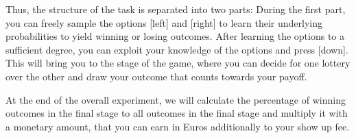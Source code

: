 \documentclass[12pt, oneside]{scrartcl}
\begin{document}
Thus, the structure of the task is separated into two parts: During the first part, you can freely sample the options [left] and [right] to learn their underlying probabilities to yield winning or losing outcomes. After learning the options to a sufficient degree, you can exploit your knowledge of the options and press [down]. This will bring you to the stage of the game, where you can decide for one lottery over the other and draw your outcome that counts towards your payoff. \vspace{\baselineskip}

At the end of the overall experiment, we will calculate the percentage of winning outcomes in the final stage to all outcomes in the final stage and multiply it with a monetary amount, that you can earn in Euros additionally to your show up fee.

\pagebreak
\end{document}

